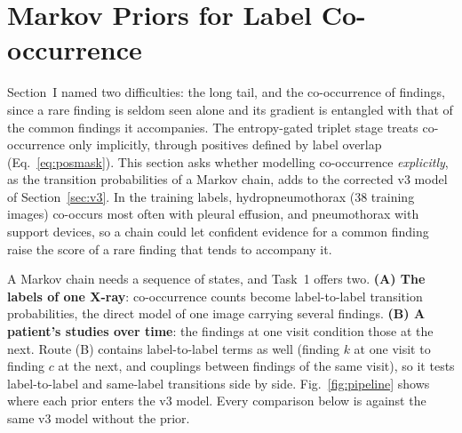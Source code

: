 \documentclass[conference]{IEEEtran}
\begin{document}
\section{Markov Priors for Label Co-occurrence}
\label{sec:markov}
Section~I named two difficulties: the long tail, and the co-occurrence of findings, since a rare finding is seldom seen alone and its gradient is entangled with that of the common findings it accompanies. The entropy-gated triplet stage treats co-occurrence only implicitly, through positives defined by label overlap (Eq.~\ref{eq:posmask}). This section asks whether modelling co-occurrence \emph{explicitly}, as the transition probabilities of a Markov chain, adds to the corrected v3 model of Section~\ref{sec:v3}. In the training labels, hydropneumothorax (38 training images) co-occurs most often with pleural effusion, and pneumothorax with support devices, so a chain could let confident evidence for a common finding raise the score of a rare finding that tends to accompany it.

A Markov chain needs a sequence of states, and Task~1 offers two. \textbf{(A) The labels of one X-ray}: co-occurrence counts become label-to-label transition probabilities, the direct model of one image carrying several findings. \textbf{(B) A patient's studies over time}: the findings at one visit condition those at the next. Route (B) contains label-to-label terms as well (finding $k$ at one visit to finding $c$ at the next, and couplings between findings of the same visit), so it tests label-to-label and same-label transitions side by side. Fig.~\ref{fig:pipeline} shows where each prior enters the v3 model. Every comparison below is against the same v3 model without the prior.
\end{document}
